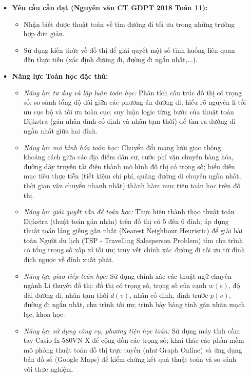 \documentclass[12pt, a4paper]{article}
\begin{document}
\begin{itemize}[leftmargin=1.2cm]
    \item \textbf{Yêu cầu cần đạt (Nguyên văn CT GDPT 2018 Toán 11):}
    \begin{itemize}[leftmargin=0.6cm]
        \item Nhận biết được thuật toán về tìm đường đi tối ưu trong những trường hợp đơn giản.
        \item Sử dụng kiến thức về đồ thị để giải quyết một số tình huống liên quan đến thực tiễn (xác định đường đi, đường đi ngắn nhất,...).
    \end{itemize}

    \item \textbf{Năng lực Toán học đặc thù:}
    \begin{itemize}[leftmargin=0.6cm]
        \item \textit{Năng lực tư duy và lập luận toán học:} Phân tích cấu trúc đồ thị có trọng số; so sánh tổng độ dài giữa các phương án đường đi; hiểu rõ nguyên lí tối ưu cục bộ và tối ưu toàn cục; suy luận logic từng bước của thuật toán Dijkstra (gán nhãn đỉnh cố định và nhãn tạm thời) để tìm ra đường đi ngắn nhất giữa hai đỉnh.
        \item \textit{Năng lực mô hình hóa toán học:} Chuyển đổi mạng lưới giao thông, khoảng cách giữa các địa điểm dân cư, cước phí vận chuyển hàng hóa, đường dây truyền tải điện thành mô hình đồ thị có trọng số; biểu diễn mục tiêu thực tiễn (tiết kiệm chi phí, quãng đường di chuyển ngắn nhất, thời gian vận chuyển nhanh nhất) thành hàm mục tiêu toán học trên đồ thị.
        \item \textit{Năng lực giải quyết vấn đề toán học:} Thực hiện thành thạo thuật toán Dijkstra (thuật toán gán nhãn) trên đồ thị có $5$ đến $6$ đỉnh; áp dụng thuật toán láng giềng gần nhất (Nearest Neighbour Heuristic) để giải bài toán Người du lịch (TSP - Travelling Salesperson Problem) tìm chu trình có tổng trọng số xấp xỉ tối ưu; truy vết chính xác đường đi tối ưu từ đỉnh đích ngược về đỉnh xuất phát.
        \item \textit{Năng lực giao tiếp toán học:} Sử dụng chính xác các thuật ngữ chuyên ngành Lí thuyết đồ thị: đồ thị có trọng số, trọng số của cạnh $w(e)$, độ dài đường đi, nhãn tạm thời $d(v)$, nhãn cố định, đỉnh trước $p(v)$, đường đi ngắn nhất, chu trình tối ưu; trình bày bảng tính gán nhãn mạch lạc, khoa học.
        \item \textit{Năng lực sử dụng công cụ, phương tiện học toán:} Sử dụng máy tính cầm tay Casio fx-580VN X để cộng dồn các trọng số; khai thác các phần mềm mô phỏng thuật toán đồ thị trực tuyến (như Graph Online) và ứng dụng bản đồ số (Google Maps) để kiểm chứng kết quả thuật toán và so sánh với thực nghiệm.
    \end{itemize}


\end{itemize}
\end{document}
